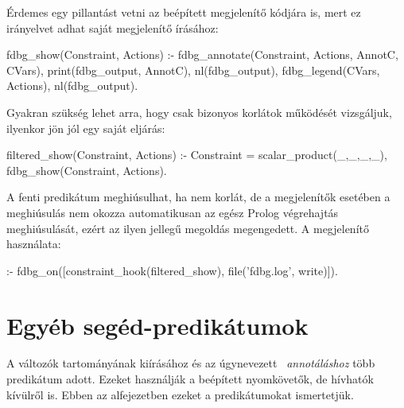 Érdemes egy pillantást vetni az  beépített megjelenítő kódjára is,
mert ez irányelvet adhat saját megjelenítő írásához:

\begin{prologcode}
fdbg_show(Constraint, Actions) :-
        fdbg_annotate(Constraint, Actions, AnnotC, CVars),
        print(fdbg_output, AnnotC),
        nl(fdbg_output),
        fdbg_legend(CVars, Actions),
        nl(fdbg_output).
\end{prologcode}

Gyakran szükség lehet arra, hogy csak bizonyos korlátok működését vizsgáljuk,
ilyenkor jön jól egy saját  eljárás:

\begin{prologcode}
filtered_show(Constraint, Actions) :-
        Constraint = scalar_product(_,_,_,_),
        fdbg_show(Constraint, Actions).
\end{prologcode}

A fenti predikátum meghiúsulhat, ha  nem  korlát,
de a megjelenítők esetében a meghiúsulás nem okozza automatikusan az egész Prolog
végrehajtás meghiúsulását, ezért az ilyen jellegű megoldás megengedett. A
megjelenítő használata:

\begin{prologcode}
:- fdbg_on([constraint_hook(filtered_show), file('fdbg.log', write)]).
\end{prologcode}

\section{Egyéb segéd-predikátumok}

A változók tartományának kiírásához és az úgynevezett ~\emph{annotáláshoz} több
predikátum adott.  Ezeket használják a beépített nyomkövetők, de hívhatók
kívülről is. Ebben az alfejezetben ezeket a predikátumokat ismertetjük.

